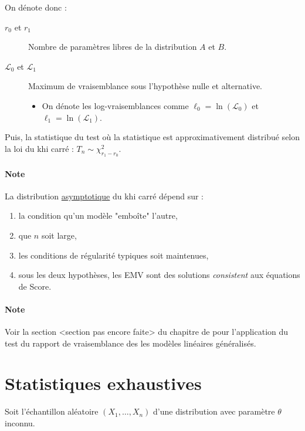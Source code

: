 \documentclass[french]{article}
\begin{document}
\begin{multicols*}{2}
\begin{definitionNOHFILL}
On dénote donc : 
\begin{description}
	\item[$r_{0}$ et $r_{1}$]	Nombre de paramètres libres de la distribution $A$ et $B$.
	\item[$\mathcal{L}_{0}$ et $\mathcal{L}_{1}$]	Maximum de vraisemblance sous l'hypothèse nulle et alternative.
		\begin{itemize}
		\item	On dénote les log-vraisemblances comme $\ell_{0} = \ln(\mathcal{L}_{0})$ et $\ell_{1} = \ln(\mathcal{L}_{1})$.
		\end{itemize}
\end{description}

Puis, la statistique du test  où la statistique est approximativement distribué selon la loi du khi carré : $T_{n} \sim \chi^{2}_{r_{1} - r_{0}}$. 
\end{definitionNOHFILL}


\paragraph{Note}	La distribution \underline{asymptotique} du khi carré dépend sur : 
\begin{enumerate}[label = \circled{\arabic*}{trueblue}]
	\item	la condition qu'un modèle "emboîte" l'autre, 
	\item	que $n$ soit large,
	\item	les conditions de régularité typiques soit maintenues,
	\item	sous les deux hypothèses, les EMV sont des solutions \og \textit{consistent} \fg{} aux équations de Score.
\end{enumerate}


\bigskip

\paragraph{Note}	Voir la section <section pas encore faite> du chapitre de \textit{\underline{}} pour l'application du test du rapport de vraisemblance des les modèles linéaires généralisés.




\newpage
\section{Statistiques exhaustives}\label{sec:exhStat}
Soit l'échantillon aléatoire $(X_{1}, \dots, X_{n})$ d'une distribution avec paramètre $\theta$ inconnu.


\end{multicols*}
\end{document}
